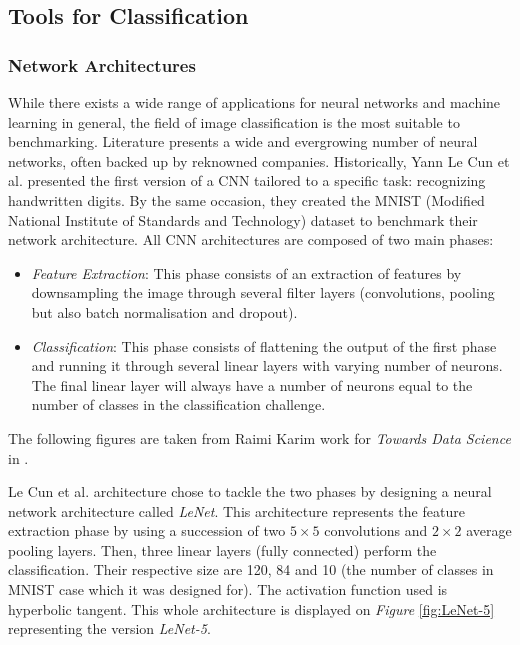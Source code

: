
\subsection{Tools for Classification}


\subsubsection{Network Architectures}

While there exists a wide range of applications for neural networks and machine learning in general, the field of image classification is the most suitable to benchmarking. Literature presents a wide and evergrowing number of neural networks, often backed up by reknowned companies. Historically, Yann Le Cun et al. \cite{LeCun1998} presented the first version of a CNN tailored to a specific task: recognizing handwritten digits. By the same occasion, they created the MNIST (Modified National Institute of Standards and Technology) dataset to benchmark their network architecture. All CNN architectures are composed of two main phases:
\begin{itemize}
  \item \emph{Feature Extraction}: This phase consists of an extraction of features by downsampling the image through several filter layers (convolutions, pooling but also batch normalisation and dropout).
  \item \emph{Classification}: This phase consists of flattening the output of the first phase and running it through several linear layers with varying number of neurons. The final linear layer will always have a number of neurons equal to the number of classes in the classification challenge.
\end{itemize}

The following figures are taken from Raimi Karim work for \emph{Towards Data Science} in \cite{Karim2020}.

Le Cun et al. \cite{LeCun1998} architecture chose to tackle the two phases by designing a neural network architecture called \emph{LeNet}. This architecture represents the feature extraction phase by using a succession of two $5 \times 5$ convolutions and $2 \times 2$ average pooling layers. Then, three linear layers (fully connected) perform the classification. Their respective size are 120, 84 and 10 (the number of classes in MNIST \cite{LeCun2010} case which it was designed for). The activation function used is hyperbolic tangent. This whole architecture is displayed on \emph{Figure} \ref{fig:LeNet-5} representing the version \emph{LeNet-5}.

